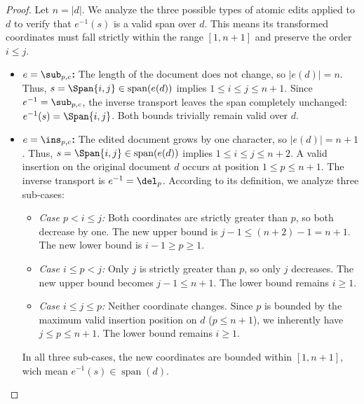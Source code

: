 \begin{proof}
	Let $n = |d|$. We analyze the three possible types of atomic edits applied to $d$ to verify that $e^{-1}(s)$ is a valid span over $d$. This means its transformed coordinates must fall strictly within the range $[1, n+1]$ and preserve the order $i \leq j$.
	
	\begin{itemize}
		\item \textbf{$e = \sub_{p,c}$:} 
		The length of the document does not change, so $|e(d)| = n$. 
		Thus, $s = \Span{i,j} \in \operatorname{span}(e(d))$ implies $1 \leq i \leq j \leq n+1$. 
		Since $e^{-1} = \sub_{p,c}$, the inverse transport leaves the span completely unchanged: $e^{-1}(s) = \Span{i,j}$. 
		Both bounds trivially remain valid over $d$.
		
		\vspace{0.3cm}
		
		\item \textbf{$e = \ins_{p,c}$:} 
		The edited document grows by one character, so $|e(d)| = n+1$. 
		Thus, $s = \Span{i,j} \in \operatorname{span}(e(d))$ implies $1 \leq i \leq j \leq n+2$. 
		A valid insertion on the original document $d$ occurs at position $1 \leq p \leq n+1$. The inverse transport is $e^{-1} = \del_p$. According to its definition, we analyze three sub-cases:
		\begin{itemize}
			\item \textit{Case $p < i \leq j$:} Both coordinates are strictly greater than $p$, so both decrease by one. The new upper bound is $j-1 \leq (n+2)-1 = n+1$. The new lower bound is $i-1 \geq p \geq 1$.
			\item \textit{Case $i \leq p < j$:} Only $j$ is strictly greater than $p$, so only $j$ decreases. The new upper bound becomes $j-1 \leq n+1$. The lower bound remains $i \geq 1$.
			\item \textit{Case $i \leq j \leq p$:} Neither coordinate changes. Since $p$ is bounded by the maximum valid insertion position on $d$ ($p \leq n+1$), we inherently have $j \leq p \leq n+1$. The lower bound remains $i \geq 1$.
		\end{itemize}
		In all three sub-cases, the new coordinates are bounded within $[1, n+1]$, wich mean $e^{-1}(s) \in \operatorname{span}(d)$.
		

\end{itemize}
\end{proof}
